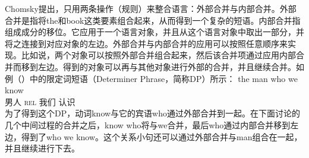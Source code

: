 Chomsky提出，只用两条操作（规则）来整合语言：外部合并与内部合并。外部合并是指将the和book这类要素组合起来，从而得到一个复杂的短语。内部合并指组成成分的移位。它应用于一个语言对象，并且从这个语言对象中取出一部分，并将之连接到对应对象的左边。外部合并与内部合并的应用可以按照任意顺序来实现。比如说，两个对象可以按照外部合并组合起来，然后该合并项通过应用内部合并而移到左边。得到的对象可以再与其他对象进行外部的合并，并且继续合并。如例（）中的限定词短语（Determiner Phrase，简称DP）所示：
\ea
\gll the          man who            we know\\
      男人 \textsc{rel} 我们 认识\\
\z
为了得到这个DP，动词know与它的宾语who通过外部合并到一起。在下面讨论的几个中间过程的合并之后，know who将与we合并，最后who通过内部合并移到左边，得到了who we know。这个关系小句还可以通过外部合并与man组合在一起，并且继续进行下去。

